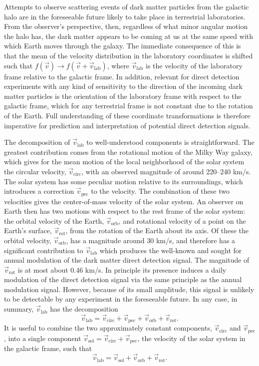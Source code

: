 Attempts to observe scattering events of dark matter particles from the galactic halo are in the foreseeable future likely to take place in terrestrial laboratories. From the observer's perspective, then, regardless of what minor angular motion the halo has, the dark matter appears to be coming at us at the same speed with which Earth moves through the galaxy. The immediate consequence of this is that the mean of the velocity distribution in the laboratory coordinates is shifted such that $f(\vec{v})\rightarrow f(\vec{v}+\vec{v}_\text{lab})$, where $\vec{v}_\text{lab}$ is the velocity of the laboratory frame relative to the galactic frame. In addition, relevant for direct detection experiments with any kind of sensitivity to the direction of the incoming dark matter particles is the orientation of the laboratory frame with respect to the galactic frame, which for any terrestrial frame is not constant due to the rotation of the Earth. Full understanding of these coordinate transformations is therefore imperative for prediction and interpretation of potential direct detection signals.

The decomposition of $\vec{v}_\text{lab}$ to well-understood components is straightforward. The greatest contribution comes from the rotational motion of the Milky Way galaxy, which gives for the mean motion of the local neighborhood of the solar system the circular velocity, $\vec{v}_\text{circ}$, with an observed magnitude of around 220--240 km/s. The solar system has some peculiar motion relative to its surroundings, which introduces a correction $\vec{v}_\text{pec}$ to the velocity. The combination of these two velocities gives the center-of-mass velocity of the solar system. An observer on Earth then has two motions with respect to the rest frame of the solar system: the orbital velocity of the Earth, $\vec{v}_\text{orb}$, and rotational velocity of a point on the Earth's surface, $\vec{v}_\text{rot}$, from the rotation of the Earth about its axis. Of these the orbital velocity, $\vec{v}_\text{orb}$, has a magnitude around 30 km/s, and therefore has a significant contribution to $\vec{v}_\text{lab}$ which produces the well-known and sought for annual modulation of the dark matter direct detection signal. The magnitude of $\vec{v}_\text{rot}$ is at most about 0.46 km/s. In principle its presence induces a daily modulation of the direct detection signal via the same principle as the annual modulation signal. However, because of its small amplitude, this signal is unlikely to be detectable by any experiment in the foreseeable future. In any case, in summary, $\vec{v}_\text{lab}$ has the decomposition
\begin{equation}
    \vec{v}_\text{lab}=\vec{v}_\text{circ}+\vec{v}_\text{pec}+\vec{v}_\text{orb}+\vec{v}_\text{rot}.
\end{equation}
It is useful to combine the two approximately constant components, $\vec{v}_\text{circ}$ and $\vec{v}_\text{pec}$, into a single component $\vec{v}_\text{sol}=\vec{v}_\text{circ}+\vec{v}_\text{pec}$, the velocity of the solar system in the galactic frame, such that
\begin{equation}
    \vec{v}_\text{lab}=\vec{v}_\text{sol}+\vec{v}_\text{orb}+\vec{v}_\text{rot}.
\end{equation}

